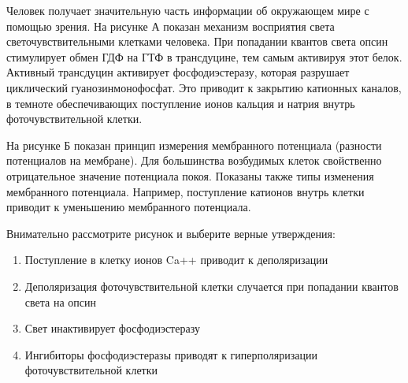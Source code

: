 
Человек
получает значительную часть информации об окружающем мире с помощью зрения. На
рисунке А показан механизм восприятия света светочувствительными клетками
человека. При попадании квантов света опсин стимулирует обмен ГДФ на ГТФ в
трансдуцине, тем самым активируя этот белок. Активный трансдуцин активирует
фосфодиэстеразу, которая разрушает циклический гуанозинмонофосфат. Это приводит
к закрытию катионных каналов, в темноте обеспечивающих поступление ионов
кальция и натрия внутрь фоточувствительной клетки.

На рисунке Б показан принцип измерения мембранного потенциала (разности
потенциалов на мембране). Для большинства возбудимых клеток свойственно
отрицательное значение потенциала покоя. Показаны также типы изменения
мембранного потенциала. Например, поступление катионов внутрь клетки приводит к
уменьшению мембранного потенциала.


Внимательно рассмотрите
рисунок и выберите верные утверждения:

\begin{enumerate}
    \item Поступление в клетку ионов Ca++ приводит к деполяризации
    \item Деполяризация фоточувствительной клетки случается при попадании квантов света на опсин
    \item Свет инактивирует фосфодиэстеразу
    \item Ингибиторы фосфодиэстеразы приводят к гиперполяризации фоточувствительной клетки
\end{enumerate}

